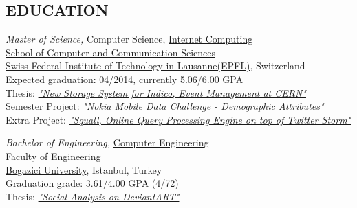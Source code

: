 \documentclass[line, margin]{res}
\begin{document}
\address{Chemin des Emetaux 7, 1131 Tolochenaz Morges, Switzerland \hspace{0.55cm} (+41) 78 926 9917}
\address{\href{mailto:ferhat.elmas@epfl.ch}{ferhat.elmas@epfl.ch} \hspace{1.75cm} \href{http://ferhatelmas.com}{ferhatelmas.com} \hspace{1.75cm}  \href{https://github.com/ferhatelmas}{github.com/ferhatelmas}}
 
\begin{resume}
 
\vspace{-0.4cm} 
  
\section{EDUCATION}
	{\sl Master of Science,} Computer Science, \href{http://ic.epfl.ch/specializations#content}{Internet Computing} \\
	\href{http://ic.epfl.ch}{School of Computer and Communication Sciences} \\
	\href{http://epfl.ch}{Swiss Federal Institute of Technology in Lausanne(EPFL)}, Switzerland \\
	Expected graduation: 04/2014, currently 5.06/6.00 GPA \\
	Thesis: \textit{\href{http://indico-software.org/}{"New Storage System for Indico, Event Management at CERN"}} \\
	Semester Project: \textit{\href{http://research.nokia.com/page/12000}{"Nokia Mobile Data Challenge - Demographic Attributes"}} \\
	Extra Project: \textit{\href{https://github.com/epfldata/squall}{"Squall, Online Query Processing Engine on top of Twitter Storm"}}
 
	{\sl Bachelor of Engineering,} \href{http://www.cmpe.boun.edu.tr/}{Computer Engineering} \\
	Faculty of Engineering \\
	\href{http://boun.edu.tr/en-US/Content/Default.aspx}{Bogazici University}, Istanbul, Turkey \\
	Graduation grade: 3.61/4.00 GPA (4/72) \\
	Thesis: \textit{\href{https://github.com/ferhatelmas/deviantART-analysis}{"Social Analysis on DeviantART"}}  

\vspace{-0.2cm}


\end{resume}
\end{document}
